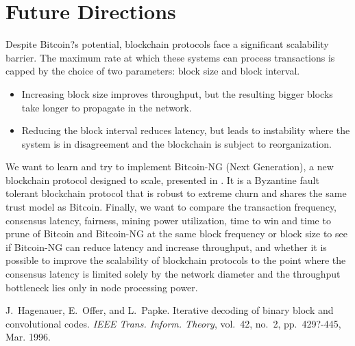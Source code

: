 \documentclass[journal, a4paper]{IEEEtran}
\begin{document}
\section{Future Directions}
Despite Bitcoin?s potential, blockchain protocols face a significant scalability barrier. The maximum rate at which these systems can process transactions is capped by the choice of two parameters: block size and block interval.
\begin{itemize}
    \item Increasing block size improves throughput, but the resulting bigger blocks take longer to propagate in the network.
    \item Reducing the block interval reduces latency, but leads to instability where the system is in disagreement and the blockchain is subject to reorganization.
\end{itemize}
We want to learn and try to implement Bitcoin-NG (Next Generation), a new blockchain protocol designed to scale, presented in . It is a Byzantine fault tolerant blockchain protocol that is robust to extreme churn and shares the same trust model as Bitcoin. Finally, we want to compare the transaction frequency, consensus latency, fairness, mining power utilization, time to win and time to prune of Bitcoin and Bitcoin-NG at the same block frequency or block size to see if Bitcoin-NG can reduce latency and increase throughput, and whether it is possible to improve the scalability of blockchain protocols to the point where the consensus latency is limited solely by the network diameter and the throughput bottleneck lies only in node processing power.

\begin{thebibliography}{5}

	J.~Hagenauer, E.~Offer, and L.~Papke. Iterative decoding of binary block
	and convolutional codes. {\em IEEE Trans. Inform. Theory},
	vol.~42, no.~2, pp.~429?-445, Mar. 1996.

\end{thebibliography}

\end{document}
